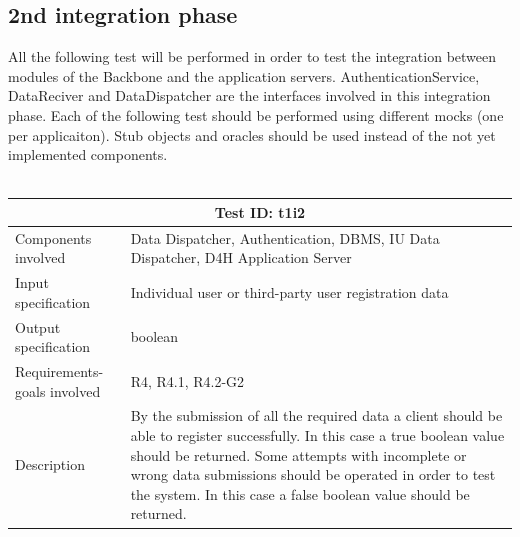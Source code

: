\subsection{2nd integration phase}
All the following test will be performed in order to test the integration between modules of the Backbone and the application servers. AuthenticationService, DataReciver and DataDispatcher are the interfaces involved in this integration phase. Each of the following test should be performed using different mocks (one per applicaiton). Stub objects and oracles should be used instead of the not yet implemented components.
\\
\\
\begin{table}[H]
\centering
\begin{tabular}{ |p{4.5cm}||p{11cm}|  }
 \hline
 \multicolumn{2}{|c|}{Test ID: t1i2} \\
 
 \hline 
 Components involved  	&    Data Dispatcher, Authentication, DBMS, IU Data Dispatcher, D4H Application Server\\
 Input specification  	&  	 Individual user or third-party user registration data\\
Output specification  	& 	  boolean\\
Requirements-goals involved &  R4, R4.1, R4.2-G2\\
Description  	&  By the submission of all the required data a client should be able to register successfully. In this case a true boolean value should be returned. Some attempts with incomplete or wrong data submissions should be operated in order to test the system. In this case a false boolean value should be returned.\\
 \hline
\end{tabular}
\end{table}
